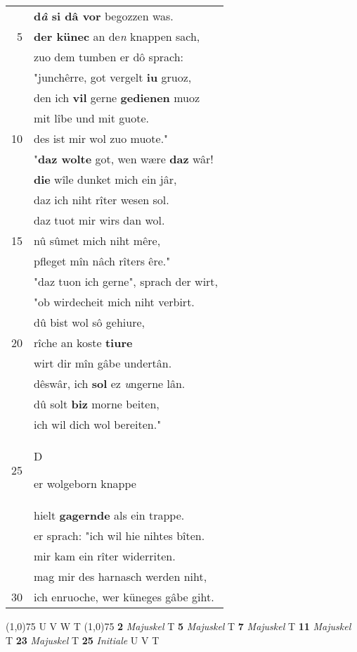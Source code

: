 \documentclass[8pt,a4paper,notitlepage]{article}
\begin{document}
\begin{table}[ht]
\begin{minipage}[t]{0.5\linewidth}
\begin{tabular}{rl}
 & \textbf{d\textit{â} si dâ vor} begozzen was.\\ 
5 & \textbf{der künec} an de\textit{n} knappen sach,\\ 
 & zuo dem tumben er dô sprach:\\ 
 & "junchêrre, got vergelt \textbf{iu} gruoz,\\ 
 & den ich \textbf{vil} gerne \textbf{gedienen} muoz\\ 
 & mit lîbe und mit guote.\\ 
10 & des ist mir wol zuo muote."\\ 
 & "\textbf{daz wolte} got, wen wære \textbf{daz} wâr!\\ 
 & \textbf{die} wîle dunket mich ein jâr,\\ 
 & daz ich niht rîter wesen sol.\\ 
 & daz tuot mir wirs dan wol.\\ 
15 & nû sûmet mich niht mêre,\\ 
 & pfleget mîn nâch rîters êre."\\ 
 & "daz tuon ich gerne", sprach der wirt,\\ 
 & "ob wirdecheit mich niht verbirt.\\ 
 & dû bist wol sô gehiure,\\ 
20 & rîche an koste \textbf{tiure}\\ 
 & wirt dir mîn gâbe undertân.\\ 
 & dêswâr, ich \textbf{sol} ez \textit{u}ngerne lân.\\ 
 & dû solt \textbf{biz} morne beiten,\\ 
 & ich wil dich wol bereiten."\\ 
25 & \begin{large}D\end{large}er wolgeborn knappe\\ 
 & hielt \textbf{gagernde} als ein trappe.\\ 
 & er sprach: "ich wil hie nihtes bîten.\\ 
 & mir kam ein rîter widerriten.\\ 
 & mag mir des harnasch werden niht,\\ 
30 & ich enruoche, wer küneges gâbe giht.\\ 
\end{tabular}
\scriptsize
\line(1,0){75} \newline
U V W T \newline
\line(1,0){75} \newline
\textbf{2} \textit{Majuskel} T  \textbf{5} \textit{Majuskel} T  \textbf{7} \textit{Majuskel} T  \textbf{11} \textit{Majuskel} T  \textbf{23} \textit{Majuskel} T  \textbf{25} \textit{Initiale} U V T  \newline

\end{minipage}
\end{table}
\end{document}
